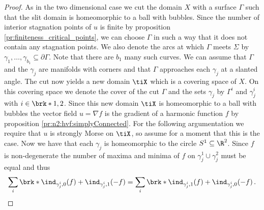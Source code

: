 \begin{proof}
  As in the two dimensional case we cut the domain $X$ with a surface $\Gamma$ such that the slit domain is
  homeomorphic to a ball with bubbles.
  Since the number of interior stagnation points of $u$ is finite by proposition \ref{pr:finiteness_critical_points}, we can choose $\Gamma$ in such a way
  that it does not contain any stagnation points. We also denote the arcs at which $\Gamma$ meets $\Sigma$ by 
  $\gamma_1,\dots,\gamma_{b_1}\subseteq\partial\Gamma$. Note that there are $b_1$ many such curves.
  We can assume that $\Gamma$ and the $\gamma_j$ are manifolds with corners and that $\Gamma$ approaches
  each $\gamma_j$ at a slanted angle.
  The cut now yields a new domain $\tiX$ which is a covering space of $X$.
  On this covering space we denote the cover of the cut $\Gamma$ and the sets $\gamma_j$ by
  $\Gamma^i$ and $\gamma_j^i$ with $i\in\brk*{1,2}$.
  Since this new domain $\tiX$ is homeomorphic to a ball with bubbles
  the vector field $u=\nabla f$ is the gradient of a harmonic function $f$ by proposition \ref{pr:n2:hvf:simplyConnected}.
  For the following argumentation we require that $u$ is strongly Morse on $\tiX$, so assume for a moment that this is the case.
  Now we have that each $\gamma_j$ is homeomorphic to the circle $S^1\subseteq\R^2$.
  Since $f$ is non-degenerate the number of maxima and minima of $f$ on $\gamma_j^1\cup\gamma_j^2$ must be equal and thus
  \begin{align}
    \sum_i\brk*{\ind_{\gamma_j^i,0}(f)+\ind_{\gamma_j^i,1}(-f)}=\sum_i\brk*{\ind_{\gamma_j^i,1}(f)+\ind_{\gamma_j^i,0}(-f)}\,.
    \label{eq:n3_hvf_noInflowNoOutflow_maxMinRel}
  \end{align}


\end{proof}
